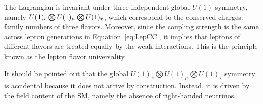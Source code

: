 The Lagrangian is invariant under three independent global $U(1)$ symmetry, namely $U(1)_{e}\bigotimes\\U(1)_{\mu}\bigotimes U(1)_{\tau}$, which correspond to the conserved charges: family numbers of three flavors. Moreover, since the coupling strength is the same across lepton generations in Equation~\ref{eq:LepCC}, it implies that leptons of different flavors are treated equally by the weak interactions. This is the principle known as the lepton flavor universality.

It should be pointed out that the global $U(1)_{e}\bigotimes U(1)_{\mu}\bigotimes U(1)_{\tau}$ symmetry is accidental because it does not arrive by construction. Instead, it is driven by the field content of the \ac{SM}, namely the absence of right-handed neutrinos. 